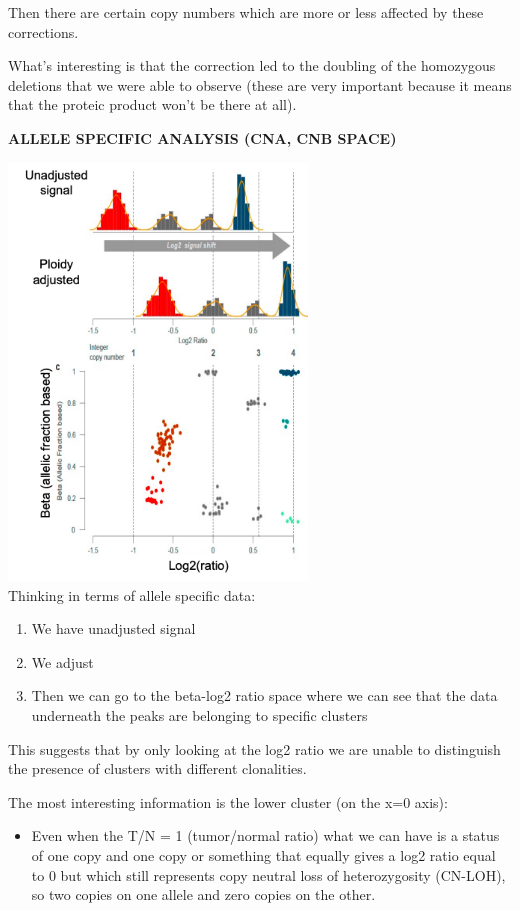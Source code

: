 Then there are certain copy numbers which are more or less affected by these
corrections.

What's interesting is that the correction led to the doubling of the homozygous
deletions that we were able to observe (these are very important because it
means that the proteic product won't be there at all).

\textbf{ALLELE SPECIFIC ANALYSIS (CNA, CNB SPACE)}

\includegraphics[width=3.12639in,height=4.35903in]{image11.png}\\

Thinking in terms of allele specific data:

\begin{enumerate}
\def\labelenumi{\arabic{enumi}.}
\item
  We have unadjusted signal
\item
  We adjust
\item
  Then we can go to the beta-log2 ratio space where we can see that the data
  underneath the peaks are belonging to specific clusters
\end{enumerate}

This suggests that by only looking at the log2 ratio we are unable to
distinguish the presence of clusters with different clonalities.

The most interesting information is the lower cluster (on the x=0 axis):

\begin{itemize}
\item
  Even when the T/N = 1 (tumor/normal ratio) what we can have is a status of one
  copy and one copy or something that equally gives a log2 ratio equal to 0 but
  which still represents copy neutral loss of heterozygosity (CN-LOH), so two
  copies on one allele and zero copies on the other.
\end{itemize}

